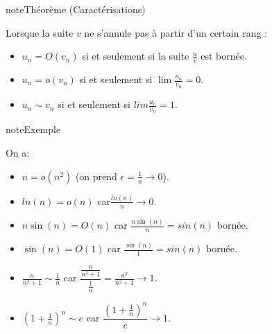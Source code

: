 \documentclass[letterpaper,10pt,french]{jupyterBook}
\begin{document}
\begin{sphinxadmonition}{note}{Théorème (Caractérisations)}

\sphinxAtStartPar
Lorsque la suite \(v\) ne s’annule pas à partir d’un certain rang :
\begin{itemize}
\item {} 
\sphinxAtStartPar
\(u_n = O(v_n)\) si et seulement si la suite \(\frac{u}{v}\) est bornée.

\item {} 
\sphinxAtStartPar
\(u_n = o(v_n)\) si et seulement si \(\lim \frac{u_n}{v_n}= 0\).

\item {} 
\sphinxAtStartPar
\(u_n \sim v_n\) si et seulement si \(lim \frac{u_n}{v_n}= 1\).

\end{itemize}
\end{sphinxadmonition}

\begin{sphinxadmonition}{note}{Exemple}

\sphinxAtStartPar
On a:
\begin{itemize}
\item {} 
\sphinxAtStartPar
\(n =o(n^2)\) (on prend \(\epsilon = \frac{1}{n} \to 0\)).

\item {} 
\sphinxAtStartPar
\(ln(n) = o(n)\) car\(\frac{ln(n)}{n} \to 0\).

\item {} 
\sphinxAtStartPar
\(n\sin(n) = O(n)\) car \(\frac{n\sin(n)}{n}=sin(n)\) bornée.

\item {} 
\sphinxAtStartPar
\(\sin(n) = O(1)\) car \(\frac{\sin(n)}{1}=sin(n)\) bornée.

\item {} 
\sphinxAtStartPar
\(\frac{n}{n^2+1} \sim \frac{1}{n}\) car \(\dfrac{\frac{n}{n^2+1}}{\frac{1}{n}} = \frac{n^2}{n^2 +1} \to 1\).

\item {} 
\sphinxAtStartPar
\((1+\frac{1}{n})^n \sim e\) car \(\dfrac{(1+\frac{1}{n})^n}{e} \to 1\).

\end{itemize}
\end{sphinxadmonition}
\end{document}

